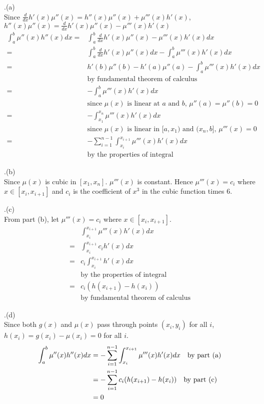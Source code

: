 \documentclass[12pt]{article}
\begin{document}
.(a)\\
Since $\frac {d} {dx} h'(x) \mu''(x) = h''(x) \mu''(x) + \mu'''(x) h'(x)$, 
$h''(x) \mu''(x) = \frac {d} {dx} h'(x) \mu''(x) - \mu'''(x) h'(x)$
\begin{align*}
    \int_a^b \mu''(x) h''(x) dx = & \int_a^b \frac {d} {dx} h'(x) \mu''(x) - \mu'''(x) h'(x) dx\\
    = & \int_a^b \frac {d} {dx} h'(x) \mu''(x) dx - \int_a^b \mu'''(x) h'(x) dx\\
    = & h'(b) \mu''(b) - h'(a) \mu''(a) - \int_a^b \mu'''(x) h'(x) dx \\
    & \text{by fundamental theorem of calculus}\\
    = & - \int_a^b \mu'''(x) h'(x) dx \\
    & \text{since $\mu(x)$ is linear at $a$ and $b$, } \mu''(a) = \mu''(b) = 0\\
    = & - \int_{x_1}^{x_n} \mu'''(x) h'(x) dx \\
    & \text{since $\mu(x)$ is linear in $[a, x_1)$ and $(x_n, b]$, } \mu'''(x) = 0\\
    = & - \sum_{i = 1} ^{n - 1} \int_{x_i}^{x_{i + 1}} \mu'''(x) h'(x) dx \\
    & \text{by the properties of integral}
\end{align*}

\newpage
{}.(b)\\
Since $\mu(x)$ is cubic in $[x_1, x_n]$. $\mu'''(x)$ is constant. Hence $\mu'''(x) = c_i$ where 
$x \in [x_i, x_{i + 1}]$ and $c_i$ is the coefficient of $x^3$ in the cubic function times 6.

\newpage
{}.(c)\\
From part (b), let $\mu'''(x) = c_i$ where $x \in [x_i, x_{i + 1}]$.
\begin{align*}
    &\int_{x_i}^{x_{i + 1}} \mu'''(x) h'(x) dx \\
    = &\int_{x_i}^{x_{i + 1}} c_i h'(x) dx\\
    = & c_i \int_{x_i}^{x_{i + 1}} h'(x) dx \\ 
    & \text{by the properties of integral}\\
    = & c_i(h(x_{i + 1}) - h(x_i)) \\ 
    & \text{by fundamental theorem of calculus}
\end{align*}

\newpage
{}.(d)\\
Since both $g(x)$ and $\mu(x)$ pass through points $(x_i, y_i)$ for all $i$, $h(x_i) = g(x_i) - \mu(x_i) = 0$
for all $i$.
\begin{align*}
    \int_a^b \mu''(x) h''(x) dx & = - \sum_{i = 1} ^{n - 1} \int_{x_i}^{x_{i + 1}} \mu'''(x) h'(x) dx 
    \text{\quad by part (a)}\\
    & = - \sum_{i = 1} ^{n - 1} c_i(h(x_{i + 1}) - h(x_i)) \text{\quad by part (c)}\\
    & = 0
\end{align*}
\end{document}
